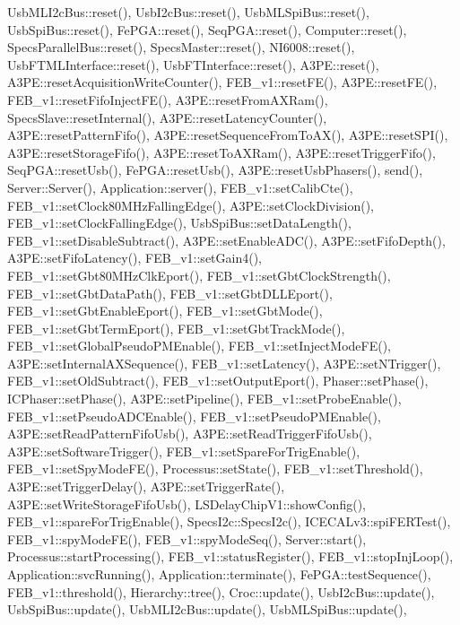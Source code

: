 Usb\+M\+L\+I2c\+Bus\+::reset(), Usb\+I2c\+Bus\+::reset(), Usb\+M\+L\+Spi\+Bus\+::reset(), Usb\+Spi\+Bus\+::reset(), Fe\+P\+G\+A\+::reset(), Seq\+P\+G\+A\+::reset(), Computer\+::reset(), Specs\+Parallel\+Bus\+::reset(), Specs\+Master\+::reset(), N\+I6008\+::reset(), Usb\+F\+T\+M\+L\+Interface\+::reset(), Usb\+F\+T\+Interface\+::reset(), A3\+P\+E\+::reset(), A3\+P\+E\+::reset\+Acquisition\+Write\+Counter(), F\+E\+B\+\_\+v1\+::reset\+F\+E(), A3\+P\+E\+::reset\+F\+E(), F\+E\+B\+\_\+v1\+::reset\+Fifo\+Inject\+F\+E(), A3\+P\+E\+::reset\+From\+A\+X\+Ram(), Specs\+Slave\+::reset\+Internal(), A3\+P\+E\+::reset\+Latency\+Counter(), A3\+P\+E\+::reset\+Pattern\+Fifo(), A3\+P\+E\+::reset\+Sequence\+From\+To\+A\+X(), A3\+P\+E\+::reset\+S\+P\+I(), A3\+P\+E\+::reset\+Storage\+Fifo(), A3\+P\+E\+::reset\+To\+A\+X\+Ram(), A3\+P\+E\+::reset\+Trigger\+Fifo(), Seq\+P\+G\+A\+::reset\+Usb(), Fe\+P\+G\+A\+::reset\+Usb(), A3\+P\+E\+::reset\+Usb\+Phasers(), send(), Server\+::\+Server(), Application\+::server(), F\+E\+B\+\_\+v1\+::set\+Calib\+Cte(), F\+E\+B\+\_\+v1\+::set\+Clock80\+M\+Hz\+Falling\+Edge(), A3\+P\+E\+::set\+Clock\+Division(), F\+E\+B\+\_\+v1\+::set\+Clock\+Falling\+Edge(), Usb\+Spi\+Bus\+::set\+Data\+Length(), F\+E\+B\+\_\+v1\+::set\+Disable\+Subtract(), A3\+P\+E\+::set\+Enable\+A\+D\+C(), A3\+P\+E\+::set\+Fifo\+Depth(), A3\+P\+E\+::set\+Fifo\+Latency(), F\+E\+B\+\_\+v1\+::set\+Gain4(), F\+E\+B\+\_\+v1\+::set\+Gbt80\+M\+Hz\+Clk\+Eport(), F\+E\+B\+\_\+v1\+::set\+Gbt\+Clock\+Strength(), F\+E\+B\+\_\+v1\+::set\+Gbt\+Data\+Path(), F\+E\+B\+\_\+v1\+::set\+Gbt\+D\+L\+L\+Eport(), F\+E\+B\+\_\+v1\+::set\+Gbt\+Enable\+Eport(), F\+E\+B\+\_\+v1\+::set\+Gbt\+Mode(), F\+E\+B\+\_\+v1\+::set\+Gbt\+Term\+Eport(), F\+E\+B\+\_\+v1\+::set\+Gbt\+Track\+Mode(), F\+E\+B\+\_\+v1\+::set\+Global\+Pseudo\+P\+M\+Enable(), F\+E\+B\+\_\+v1\+::set\+Inject\+Mode\+F\+E(), A3\+P\+E\+::set\+Internal\+A\+X\+Sequence(), F\+E\+B\+\_\+v1\+::set\+Latency(), A3\+P\+E\+::set\+N\+Trigger(), F\+E\+B\+\_\+v1\+::set\+Old\+Subtract(), F\+E\+B\+\_\+v1\+::set\+Output\+Eport(), Phaser\+::set\+Phase(), I\+C\+Phaser\+::set\+Phase(), A3\+P\+E\+::set\+Pipeline(), F\+E\+B\+\_\+v1\+::set\+Probe\+Enable(), F\+E\+B\+\_\+v1\+::set\+Pseudo\+A\+D\+C\+Enable(), F\+E\+B\+\_\+v1\+::set\+Pseudo\+P\+M\+Enable(), A3\+P\+E\+::set\+Read\+Pattern\+Fifo\+Usb(), A3\+P\+E\+::set\+Read\+Trigger\+Fifo\+Usb(), A3\+P\+E\+::set\+Software\+Trigger(), F\+E\+B\+\_\+v1\+::set\+Spare\+For\+Trig\+Enable(), F\+E\+B\+\_\+v1\+::set\+Spy\+Mode\+F\+E(), Processus\+::set\+State(), F\+E\+B\+\_\+v1\+::set\+Threshold(), A3\+P\+E\+::set\+Trigger\+Delay(), A3\+P\+E\+::set\+Trigger\+Rate(), A3\+P\+E\+::set\+Write\+Storage\+Fifo\+Usb(), L\+S\+Delay\+Chip\+V1\+::show\+Config(), F\+E\+B\+\_\+v1\+::spare\+For\+Trig\+Enable(), Specs\+I2c\+::\+Specs\+I2c(), I\+C\+E\+C\+A\+Lv3\+::spi\+F\+E\+R\+Test(), F\+E\+B\+\_\+v1\+::spy\+Mode\+F\+E(), F\+E\+B\+\_\+v1\+::spy\+Mode\+Seq(), Server\+::start(), Processus\+::start\+Processing(), F\+E\+B\+\_\+v1\+::status\+Register(), F\+E\+B\+\_\+v1\+::stop\+Inj\+Loop(), Application\+::svc\+Running(), Application\+::terminate(), Fe\+P\+G\+A\+::test\+Sequence(), F\+E\+B\+\_\+v1\+::threshold(), Hierarchy\+::tree(), Croc\+::update(), Usb\+I2c\+Bus\+::update(), Usb\+Spi\+Bus\+::update(), Usb\+M\+L\+I2c\+Bus\+::update(), Usb\+M\+L\+Spi\+Bus\+::update(), 